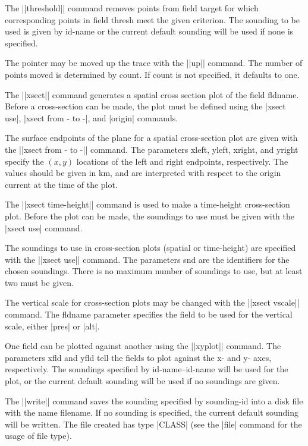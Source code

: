 \begin{glossarylist}
	The ||threshold|| command removes points from field {\pf target} 
	for which corresponding points in field {\pf thresh} meet the given 
	{\pf criterion}.  The sounding to be used is given by {\pf id-name}
	or the current default sounding will be used if none is specified.

	The pointer may be moved up the trace with the ||up|| command.  The
	number of points moved is determined by {\pf count}.  If {\pf count}
	is not specified, it defaults to one.

	The ||xsect|| command generates a spatial cross section plot of
	the field {\pf fldname}.  Before a cross-section can be made,
	the plot must be defined using the  |xsect use|, 
	|xsect from - to -|, and |origin| commands.

	The surface endpoints of the plane for a spatial cross-section
	plot are given with the ||xsect from - to -|| command.
	The parameters {\pf xleft}, {\pf yleft}, {xright}, and {\pf yright}
	specify the $(x,y)$ locations of the left and right endpoints,
	respectively.  The values should be given in km, and are interpreted
	with respect to the origin current at the time of the plot.

	The ||xsect time-height|| command is used to make a time-height
	cross-section plot.  Before the plot can be made, the soundings
	to use must be given with the |xsect use| command.

	The soundings to use in cross-section plots (spatial or time-height)
	are specified with the ||xsect use|| command.  The parameters
	{\pf snd} are the identifiers for the chosen soundings.  There
	is no maximum number of soundings to use, but at least two must
	be given.

	The vertical scale for cross-section plots may be changed with
	the ||xsect vscale|| command.  The {\pf fldname} parameter 
	specifies the field to be used for the vertical scale, either 
	|pres| or |alt|.

	One field can be plotted against another using the ||xyplot|| command.
	The parameters {\pf xfld} and {\pf yfld} tell the fields to plot
	against the x- and y- axes, respectively.  The soundings specified
	by {\pf id-name}--{\pf id-name} will be used for the
	plot, or the current default sounding will be used if no soundings
	are given.

	The ||write|| command saves the sounding specified by 
	{\pf sounding-id} into a disk file with the name {\pf filename}.
	If no sounding is specified, the current default sounding will be 
	written.  The file created has type |CLASS| (see the |file| 
	command for the usage of file type).

\end{glossarylist}
